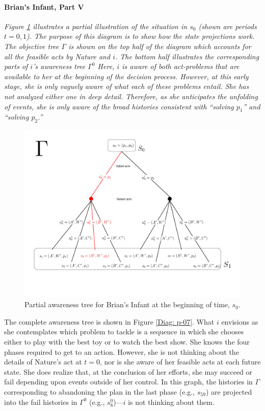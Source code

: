 \documentclass[
11pt,
titlepage,
reqno,
]{article}%
\theoremstyle{definition}
\begin{document}
\paragraph{Brian's Infant, Part V}
{\em
Figure \ref{Diag: p-06} illustrates  a partial illustration of the situation in $s_0$ (shown are periods $t=0,1$).
The purpose of this diagram is to show how the state projections work.
The objective tree $\Gamma$ is shown on the top half of the diagram which accounts for all the feasible acts by Nature and $i$.
The bottom half illustrates the corresponding parts of $i$'s awareness tree $\Gamma^{0}$
Here, $i$ is aware of both act-problems that are available to her at the beginning of the decision process.
However, at this early stage, she is only vaguely aware of what each of these problems entail.
She has not analyzed either one in deep detail.
Therefore, as she anticipates the unfolding of events, she is only aware of the broad histories consistent with ``solving $p_1$'' and ``solving $p_2$.''

\begin{figure}[h!]
	\centering
	\includegraphics*[page=6,trim = 0in 1in 0in 0in,scale=.6]{Awareness_Diagrams_All}
	\caption{Partial awareness tree for Brian's Infant at the beginning of time, $s_{0}$.\label{Diag: p-06}}%
\end{figure}

The complete awareness tree is shown in Figure \ref{Diag: p-07}.
What $i$ envisions as she contemplates which problem to tackle is a sequence in which she chooses either to play with the best toy or to watch the best show.
She knows the four phases required to get to an action.
However, she is not thinking about the details of Nature's act at $t=0$, nor is she aware of her feasible acts at each future state.
She does realize that, at the conclusion of her efforts, she may succeed or fail depending upon events outside of her control.
In this graph, the histories in $\Gamma$ corresponding to abandoning the plan in the last phase (e.g., $s_{59}$) are projected into the fail histories in $\Gamma^0$ (e.g., $s^0_8$)---$i$ is not thinking about them.

}
\end{document}
